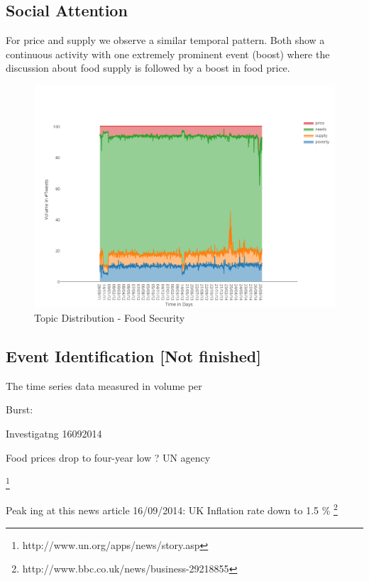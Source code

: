 \subsection{Social Attention}

For price and supply we observe a similar temporal pattern. Both show a continuous activity with one extremely prominent event (boost) where the discussion about food supply is followed by a boost in food price. 




\begin{figure}[H]
        \centering
         \includegraphics[width=1\textwidth ]{img/anal/topic_dist}
              
        \caption{Topic Distribution - Food Security}
        \label{fig:oil_heat}
\end{figure}

 
\subsection{Event Identification [Not finished]}



The time series data measured in volume per


Burst: 

Investigatng 16092014

Food prices drop to four-year low ? UN agency 

\footnote{http://www.un.org/apps/news/story.asp}


Peak ing at this news article 
16/09/2014: UK Inflation rate down to 1.5 \% \footnote{http://www.bbc.co.uk/news/business-29218855}

